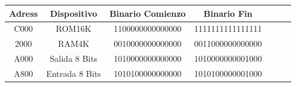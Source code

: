 



\begin{table}[H]
\centering
\begin{tabular}{ccccccc}
\hline	
\textbf{Adress} & \textbf{Dispositivo} & \textbf{Binario Comienzo} & \textbf{Binario Fin} &  &  & \\ \hline
C000 & ROM16K & 1100000000000000 & 1111111111111111 &  &  &  \\ 
2000 & RAM4K & 0010000000000000 & 0011000000000000 &  &  &  \\
A000 & Salida 8 Bits & 1010000000000000 & 1010000000001000 &  &  &  \\ 
A800 & Entrada 8 Bits & 1010100000000000 & 1010100000001000 &  &  &  \\ \hline
\end{tabular}
\end{table}

